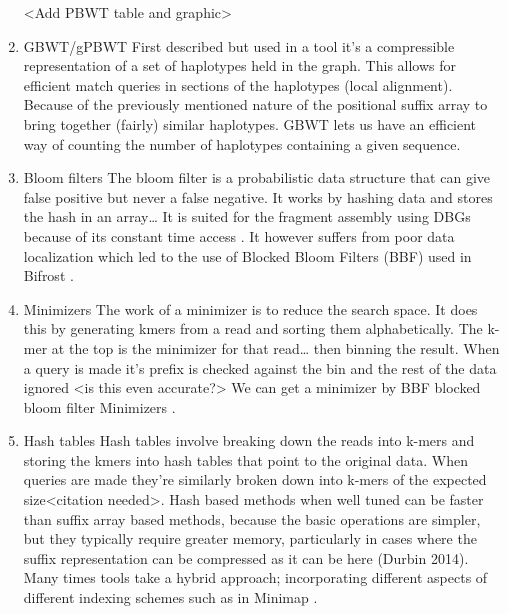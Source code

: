 \documentclass[11pt]{article}
\begin{document}
\begin{enumerate}
<Add PBWT table and graphic>

\item GBWT/gPBWT
\label{sec:orgb670665}
First described \cite{novakGraphExtensionPositional2017} but used in a tool
\cite{sirenHaplotypeawareGraphIndexes2020} it’s a compressible representation of 
a set of haplotypes held in the graph. This allows for efficient match queries 
in sections of the haplotypes (local alignment). Because of the previously
mentioned nature of the positional suffix array to bring together (fairly) 
similar haplotypes.
GBWT lets us have an efficient way of counting the number of haplotypes 
containing a given sequence.

\item Bloom filters
\label{sec:org27536e4}
The bloom filter is a probabilistic data structure that can give false positive
but never a false negative.  It works by hashing data and stores the hash in an
array\ldots{}
It is suited for the fragment assembly using DBGs because of its constant time
access \cite{chikhiSpaceefficientExactBruijn2013}. It however suffers from poor
data localization  which led to the use of Blocked Bloom Filters (BBF) 
\cite{putzeCacheHashSpaceefficient2010} used in
Bifrost \cite{holleyBifrostHighlyParallel2019}.

\item Minimizers
\label{sec:org5e3c77a}
The work of a minimizer is to reduce the search space. It does this by generating
kmers from a read and sorting them alphabetically. The k-mer at the top is the
minimizer for that read\ldots{} then binning the result. When a query is made it’s
prefix is checked against the bin and the rest of the data ignored
<is this even accurate?>
We can get a minimizer by BBF blocked bloom filter Minimizers
\cite{grabowskiDiskbasedCompressionData2015,robertsReducingStorageRequirements2004}.

\item Hash tables
\label{sec:org924b39d}
Hash tables involve breaking down the reads into k-mers and storing the kmers
into hash tables that point to the original data. When queries are made they’re 
similarly broken down into k-mers of the expected size<citation needed>.
Hash based methods when well tuned can be faster than suffix array based 
methods, because the basic operations are simpler, but they typically require
greater memory, particularly in cases where the suffix representation can be
compressed as it can be here (Durbin 2014).
Many times tools take a hybrid approach; incorporating different aspects of
different indexing schemes such as in Minimap
\cite{liDesignConstructionReference2020}. 
\end{enumerate}
\end{document}
